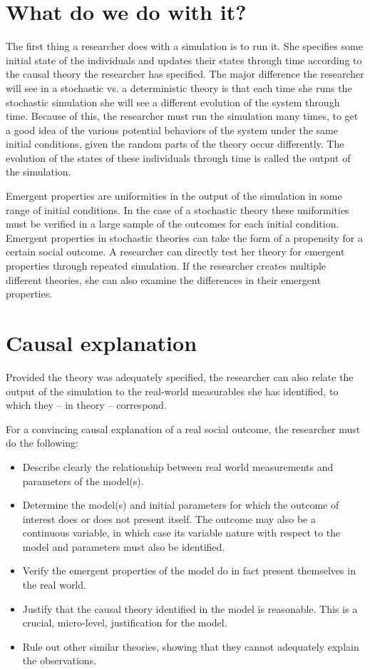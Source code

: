 \documentclass[]{article}
\begin{document}
	\section{What do we do with it?}
	
	The first thing a researcher does with a simulation is to run it. 
	She specifies some initial state of the individuals and updates their states through time according to the causal theory the researcher has specified.
	The major difference the researcher will see in a stochastic vs. a deterministic theory is that each time she runs the stochastic simulation she will see a different evolution of the system through time.
	Because of this, the researcher must run the simulation many times, to get a good idea of the various potential behaviors of the system under the same initial conditions, given the random parts of the theory occur differently.
	The evolution of the states of these individuals through time is called the output of the simulation.
	
	Emergent properties are uniformities in the output of the simulation in some range of initial conditions. 
	In the case of a stochastic theory these uniformities must be verified in a large sample of the outcomes for each initial condition.
	Emergent properties in stochastic theories can take the form of a propensity for a certain social outcome.
	A researcher can directly test her theory for emergent properties through repeated simulation.
	If the researcher creates multiple different theories, she can also examine the differences in their emergent properties. 
	
	\section{Causal explanation}
	
	Provided the theory was adequately specified, the researcher can also relate the output of the simulation to the real-world measurables she has identified, to which they -- in theory -- correspond.
	
	For a convincing causal explanation of a real social outcome, the researcher must do the following:
	
	\begin{itemize}
		\item Describe clearly the relationship between real world measurements and parameters of the model(s).
		\item Determine the model(s) and initial parameters for which the outcome of interest does or does not present itself. The outcome may also be a continuous variable, in which case its variable nature with respect to the model and parameters must also be identified.
		\item Verify the emergent properties of the model do in fact present themselves in the real world.
		\item Justify that the causal theory identified in the model is reasonable. This is a crucial, micro-level, justification for the model.
		\item Rule out other similar theories, showing that they cannot adequately explain the observations.
	\end{itemize}
\end{document}
